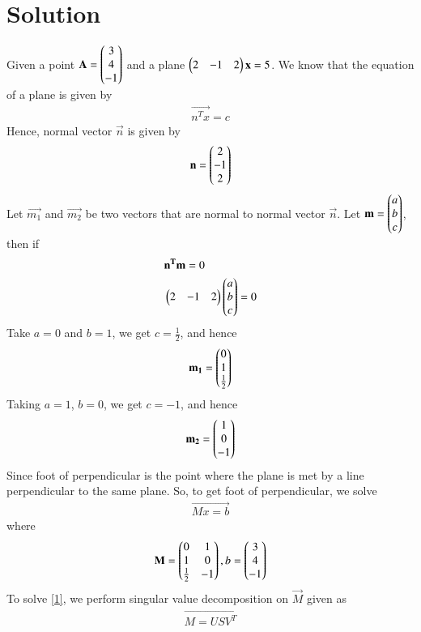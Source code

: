 \documentclass[journal,12pt,twocolumn]{IEEEtran}
\begin{document}
\section{Solution}
Given a point $\mathbf{A} = \begin{pmatrix}3 \\4\\-1\end{pmatrix}$  and a plane $\begin{pmatrix}2 & -1 & 2\end{pmatrix}\mathbf{x}=5$. We know that the equation of a plane is given by
\begin{align}
	\vec{n^Tx}= c
\end{align}
Hence, normal vector $\vec{n}$ is given by
\begin{align}
	\mathbf{n} = \begin{pmatrix}2 \\ -1\\ 2 \end{pmatrix}
\end{align}
Let $\vec{m_1}$ and $\vec{m_2}$ be two vectors that are normal to normal vector $\vec{n}$.
Let $\mathbf{m}= \begin{pmatrix}a\\b\\c\end{pmatrix}$, then if
\begin{align}
& \mathbf{n^Tm}= 0 \\
& \begin{pmatrix}2 & -1 &2\end{pmatrix}\begin{pmatrix}a\\b\\c\end{pmatrix} = 0
\end{align}
Take $a=0$ and $b=1$, we get $c=\frac{1}{2}$, and hence
\begin{align}
	\mathbf{m_1}= \begin{pmatrix}0\\1\\\frac{1}{2}\end{pmatrix}
\end{align}
Taking $a =1$, $b=0$, we get $c=-1$, and hence
\begin{align}
	\mathbf{m_2}= \begin{pmatrix}1\\0\\-1\end{pmatrix}
\end{align}
Since  foot of perpendicular is the point where the plane is met by a line perpendicular to the same plane. So, to get foot of perpendicular, we solve
\begin{align}
\vec{Mx=b} \label{1}
\end{align}
where
\begin{align}
\mathbf{M} = \begin{pmatrix}0 & 1 \\ 1 & 0 \\ \frac{1}{2} & -1\end{pmatrix},b = \begin{pmatrix}3 \\4\\-1\end{pmatrix}\label{2}	
\end{align}
To solve \eqref{1}, we perform singular value decomposition on $\vec{M}$ given as 
\begin{align}
	\vec{M = USV^T }\label{3}
\end{align}
\end{document}
